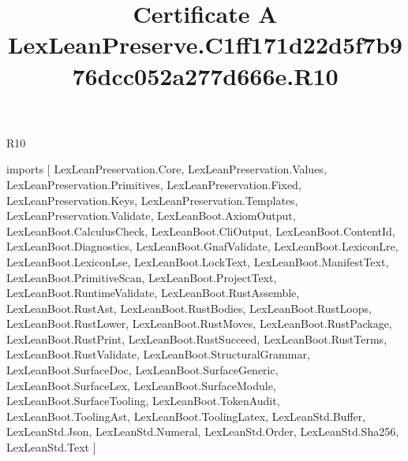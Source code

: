 \begin{lexlean}{R10}
\title{Certificate A LexLeanPreserve.C1ff171d22d5f7b976dcc052a277d666e.R10}
\begin{coremodule}
imports [
  LexLeanPreservation.Core,
  LexLeanPreservation.Values,
  LexLeanPreservation.Primitives,
  LexLeanPreservation.Fixed,
  LexLeanPreservation.Keys,
  LexLeanPreservation.Templates,
  LexLeanPreservation.Validate,
  LexLeanBoot.AxiomOutput,
  LexLeanBoot.CalculusCheck,
  LexLeanBoot.CliOutput,
  LexLeanBoot.ContentId,
  LexLeanBoot.Diagnostics,
  LexLeanBoot.GnafValidate,
  LexLeanBoot.LexiconLre,
  LexLeanBoot.LexiconLse,
  LexLeanBoot.LockText,
  LexLeanBoot.ManifestText,
  LexLeanBoot.PrimitiveScan,
  LexLeanBoot.ProjectText,
  LexLeanBoot.RuntimeValidate,
  LexLeanBoot.RustAssemble,
  LexLeanBoot.RustAst,
  LexLeanBoot.RustBodies,
  LexLeanBoot.RustLoops,
  LexLeanBoot.RustLower,
  LexLeanBoot.RustMoves,
  LexLeanBoot.RustPackage,
  LexLeanBoot.RustPrint,
  LexLeanBoot.RustSucceed,
  LexLeanBoot.RustTerms,
  LexLeanBoot.RustValidate,
  LexLeanBoot.StructuralGrammar,
  LexLeanBoot.SurfaceDoc,
  LexLeanBoot.SurfaceGeneric,
  LexLeanBoot.SurfaceLex,
  LexLeanBoot.SurfaceModule,
  LexLeanBoot.SurfaceTooling,
  LexLeanBoot.TokenAudit,
  LexLeanBoot.ToolingAst,
  LexLeanBoot.ToolingLatex,
  LexLeanStd.Buffer,
  LexLeanStd.Json,
  LexLeanStd.Numeral,
  LexLeanStd.Order,
  LexLeanStd.Sha256,
  LexLeanStd.Text
]


\end{coremodule}
\end{lexlean}
